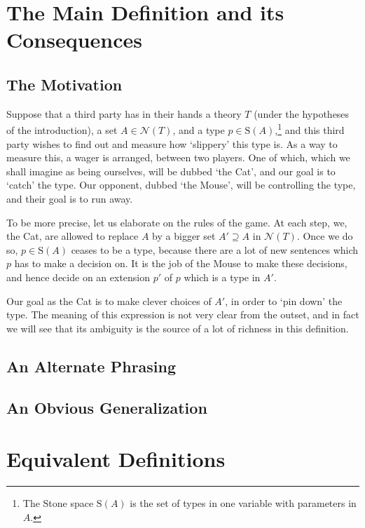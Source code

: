 \documentclass{article}
\theoremstyle{nonumberplain}
\newcommand{\calN}{\mathcal{N}}
\newcommand{\Stone}{\mathrm{S}}
\begin{document}
\section{The Main Definition and its Consequences}

\subsection{The Motivation}

Suppose that a third party has in their hands a theory $T$ (under the hypotheses of the introduction), a set $A \in \calN(T)$, and a type $p \in \Stone(A)$,\footnote{The Stone space $\Stone(A)$ is the set of types in one variable with parameters in $A$.} and this third party wishes to find out and measure how `slippery' this type is. As a way to measure this, a wager is arranged, between two players. One of which, which we shall imagine as being ourselves, will be dubbed `the Cat', and our goal is to `catch' the type. Our opponent, dubbed `the Mouse', will be controlling the type, and their goal is to run away.

To be more precise, let us elaborate on the rules of the game. At each step, we, the Cat, are allowed to replace $A$ by a bigger set $A' \supseteq A$ in $\calN(T)$. Once we do so, $p \in \Stone(A)$ ceases to be a type, because there are a lot of new sentences which $p$ has to make a decision on. It is the job of the Mouse to make these decisions, and hence decide on an extension $p'$ of $p$ which is a type in $A'$.

Our goal as the Cat is to make clever choices of $A'$, in order to `pin down' the type. The meaning of this expression is not very clear from the outset, and in fact we will see that its ambiguity is the source of a lot of richness in this definition. 

\subsection{An Alternate Phrasing}

\subsection{An Obvious Generalization}

\section{Equivalent Definitions}





\end{document}
